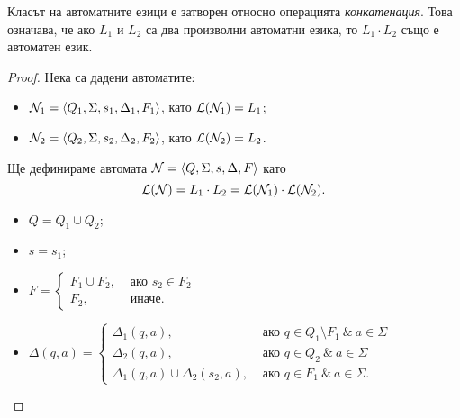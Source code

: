 \begin{lemma}
  \label{lem:concat}
  Класът на автоматните езици е затворен относно операцията {\em конкатенация}.
  Това означава, че ако $L_1$ и $L_2$ са два произволни автоматни езика, то $L_1\cdot L_2$
  също е автоматен език.
\end{lemma}
\begin{proof}
  Нека са дадени автоматите:
  \begin{itemize}
  \item
    $\mathcal{N}_1 = \langle{Q_1,\Sigma,s_1,\Delta_1,F_1}\rangle$, като $\mathcal{L}(\mathcal{N}_1) = L_1$;
  \item
    $\mathcal{N}_2 = \langle{Q_2,\Sigma,s_2,\Delta_2,F_2}\rangle$, като $\mathcal{L}(\mathcal{N}_2) = L_2$.
  \end{itemize}
  Ще дефинираме автомата $\mathcal{N} = \langle{Q,\Sigma,s,\Delta,F}\rangle$ като
  \[\mathcal{L}(\mathcal{N}) = L_1\cdot L_2 = \mathcal{L}(\mathcal{N}_1)\cdot\mathcal{L}(\mathcal{N}_2).\]
  \begin{itemize}
  \item
    $Q = Q_1 \cup Q_2$;
  \item
    $s = s_1$;
  \item
    $F = 
    \begin{cases}
      F_1 \cup F_2, & \text{ ако } s_2 \in F_2\\
      F_2,          & \text{ иначе}.
    \end{cases}$
  \item 
    $\Delta(q,a) = 
    \begin{cases}
      \Delta_1(q,a),                      & \text{ ако }q\in Q_1\setminus F_1\ \&\ a\in\Sigma\\
      \Delta_2(q,a),                      & \text{ ако }q\in Q_2\ \&\ a\in\Sigma\\
      \Delta_1(q,a) \cup \Delta_2(s_2,a), & \text{ ако }q \in F_1\ \&\ a\in\Sigma.
    \end{cases}$
  \end{itemize}
\end{proof}

